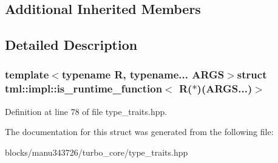 \subsection*{Additional Inherited Members}


\subsection{Detailed Description}
\subsubsection*{template$<$typename R, typename... A\+R\+G\+S$>$struct tml\+::impl\+::is\+\_\+runtime\+\_\+function$<$ R($\ast$)(\+A\+R\+G\+S...)$>$}



Definition at line 78 of file type\+\_\+traits.\+hpp.



The documentation for this struct was generated from the following file\+:\begin{DoxyCompactItemize}
\item 
blocks/manu343726/turbo\+\_\+core/type\+\_\+traits.\+hpp\end{DoxyCompactItemize}
